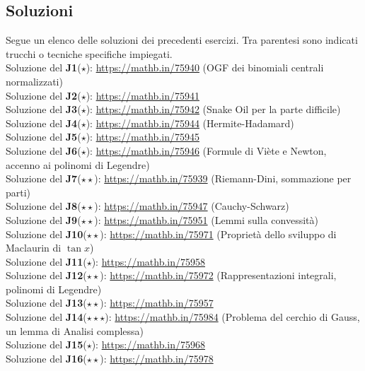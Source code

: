 \documentclass[a4paper,twoside]{article}
\theoremstyle{definition}
\numberwithin{theorem}{section}
\begin{document}
\newpage

\subsection{Soluzioni}
Segue un elenco delle soluzioni dei precedenti esercizi. Tra parentesi sono indicati trucchi o tecniche specifiche impiegati.\\

Soluzione del \textbf{J1}($\star$): \url{https://mathb.in/75940} (OGF dei binomiali centrali normalizzati)\\
Soluzione del \textbf{J2}($\star$): \url{https://mathb.in/75941} \\
Soluzione del \textbf{J3}($\star$): \url{https://mathb.in/75942} (Snake Oil per la parte difficile)\\
Soluzione del \textbf{J4}($\star$): \url{https://mathb.in/75944} (Hermite-Hadamard)\\
Soluzione del \textbf{J5}($\star$): \url{https://mathb.in/75945} \\
Soluzione del \textbf{J6}($\star$): \url{https://mathb.in/75946} (Formule di Viète e Newton, accenno ai polinomi di Legendre)\\
Soluzione del \textbf{J7}($\star\star$): \url{https://mathb.in/75939} (Riemann-Dini, sommazione per parti) \\
Soluzione del \textbf{J8}($\star\star$): \url{https://mathb.in/75947} (Cauchy-Schwarz)\\
Soluzione del \textbf{J9}($\star\star$): \url{https://mathb.in/75951} (Lemmi sulla convessità) \\
Soluzione del \textbf{J10}($\star\star$): \url{https://mathb.in/75971} (Proprietà dello sviluppo di Maclaurin di $\tan x$)\\
Soluzione del \textbf{J11}($\star$): \url{https://mathb.in/75958} \\
Soluzione del \textbf{J12}($\star\star$): \url{https://mathb.in/75972} (Rappresentazioni integrali, polinomi di Legendre)\\
Soluzione del \textbf{J13}($\star\star$): \url{https://mathb.in/75957} \\
Soluzione del \textbf{J14}($\star\star\star$): \url{https://mathb.in/75984} (Problema del cerchio di Gauss, un lemma di Analisi complessa)\\
Soluzione del \textbf{J15}($\star$): \url{https://mathb.in/75968} \\
Soluzione del \textbf{J16}($\star\star$): \url{https://mathb.in/75978} \\
\end{document}

